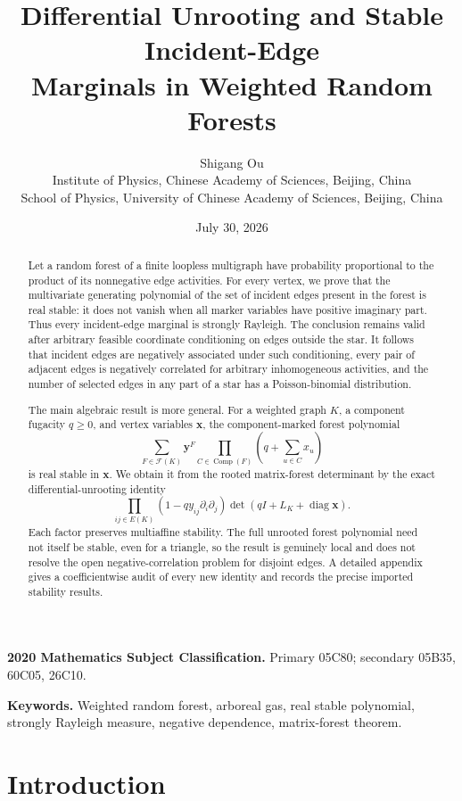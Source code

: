 \documentclass[11pt]{article}
\title{\textbf{Differential Unrooting and Stable Incident-Edge\\Marginals in Weighted Random Forests}}
\author{Shigang Ou\\
\small Institute of Physics, Chinese Academy of Sciences, Beijing, China\\
\small School of Physics, University of Chinese Academy of Sciences, Beijing, China}
\date{July 30, 2026}
\numberwithin{equation}{section}
\newcommand{\cF}{\mathcal F}
\newcommand{\yy}{\bm y}
\newcommand{\xx}{\bm x}
\newcommand{\diag}{\operatorname{diag}}
\newcommand{\Comp}{\operatorname{Comp}}
\begin{document}
\maketitle

\begin{abstract}
Let a random forest of a finite loopless multigraph have probability proportional to the product of its nonnegative edge activities.  For every vertex, we prove that the multivariate generating polynomial of the set of incident edges present in the forest is real stable: it does not vanish when all marker variables have positive imaginary part.  Thus every incident-edge marginal is strongly Rayleigh.  The conclusion remains valid after arbitrary feasible coordinate conditioning on edges outside the star.  It follows that incident edges are negatively associated under such conditioning, every pair of adjacent edges is negatively correlated for arbitrary inhomogeneous activities, and the number of selected edges in any part of a star has a Poisson-binomial distribution.

The main algebraic result is more general.  For a weighted graph $K$, a component fugacity $q\geq0$, and vertex variables $\xx$, the component-marked forest polynomial
\[
 \sum_{F\in\cF(K)}\yy^F
 \prod_{C\in\Comp(F)}\left(q+\sum_{u\in C}x_u\right)
\]
is real stable in $\xx$.  We obtain it from the rooted matrix-forest determinant by the exact differential-unrooting identity
\[
 \prod_{ij\in E(K)}\left(1-qy_{ij}\partial_i\partial_j\right)
 \det\!\left(qI+L_K+\diag\xx\right).
\]
Each factor preserves multiaffine stability.  The full unrooted forest polynomial need not itself be stable, even for a triangle, so the result is genuinely local and does not resolve the open negative-correlation problem for disjoint edges.  A detailed appendix gives a coefficientwise audit of every new identity and records the precise imported stability results.
\end{abstract}

\noindent\textbf{2020 Mathematics Subject Classification.}
Primary 05C80; secondary 05B35, 60C05, 26C10.

\noindent\textbf{Keywords.}
Weighted random forest, arboreal gas, real stable polynomial, strongly Rayleigh measure, negative dependence, matrix-forest theorem.

\section{Introduction}\label{sec:intro}
\end{document}
